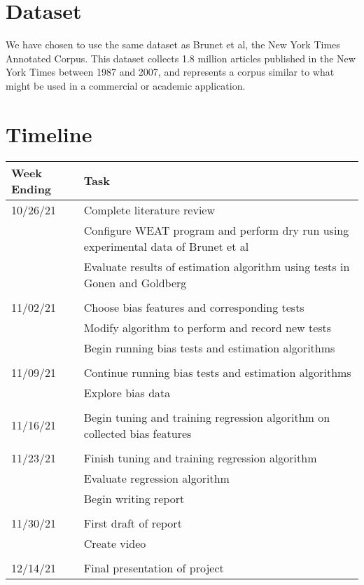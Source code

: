 \documentclass{article}
\begin{document}
\section{Dataset}

We have chosen to use the same dataset as Brunet et al, the New York
Times Annotated Corpus\cite{sandhaus_evan_new_2008}. This dataset
collects 1.8 million articles published in the New York Times between
1987 and 2007, and represents a corpus similar to what might be used in
a commercial or academic application\cite{brunet_understanding_2019}.

\section{Timeline}

\begin{tabular}{p{1in}|p{\dimexpr\linewidth-1in-4\tabcolsep}}
    \hline
    \textbf{Week Ending} & \textbf{Task} \\
    \hline
    10/26/21 & Complete literature review \\
             & Configure WEAT program and perform dry run using
             experimental data of Brunet et
             al\cite{brunet_understanding_2019} \\
             & Evaluate results of estimation algorithm using tests in
             Gonen and Goldberg\cite{gonen_lipstick_2019} \\
             &\\
    11/02/21 & Choose bias features and corresponding tests \\
             & Modify algorithm to perform and record new tests \\
             & Begin running bias tests and estimation algorithms \\
             &\\
    11/09/21 & Continue running bias tests and estimation algorithms \\
             & Explore bias data \\
             &\\
    11/16/21 & Begin tuning and training regression algorithm on
    collected bias features \\
             &\\
    11/23/21 & Finish tuning and training regression algorithm \\
             & Evaluate regression algorithm \\
             & Begin writing report \\
             &\\
    11/30/21 & First draft of report \\
             & Create video \\
             &\\
    12/14/21 & Final presentation of project \\
    \hline
\end{tabular}
\end{document}

